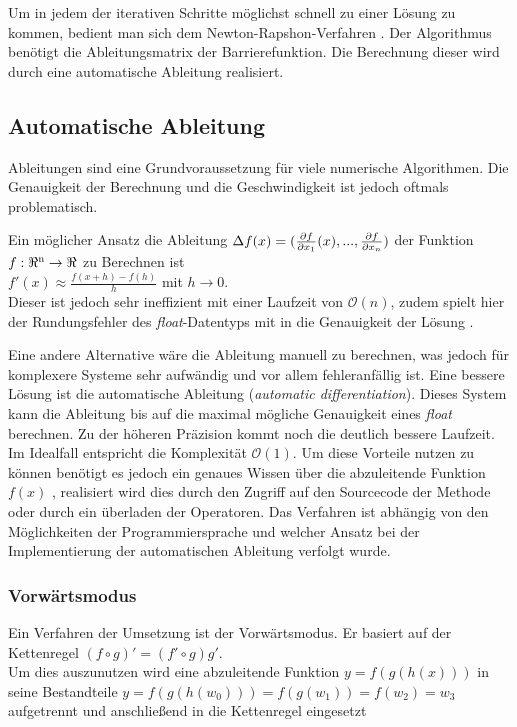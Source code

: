 \documentclass{like}
\begin{document}
Um in jedem der iterativen Schritte möglichst schnell zu einer Lösung zu kommen, bedient man sich dem Newton-Rapshon-Verfahren . 
Der Algorithmus benötigt die Ableitungsmatrix der Barrierefunktion. Die Berechnung dieser wird durch eine automatische Ableitung realisiert.

\subsection{Automatische Ableitung} 

Ableitungen sind eine Grundvoraussetzung für viele numerische Algorithmen. Die Genauigkeit der Berechnung und die Geschwindigkeit ist jedoch oftmals problematisch.

Ein möglicher Ansatz die Ableitung $\Delta{\tiny } f(x) = (\frac{\partial f}{\partial x_1} (x), ..., \frac{\partial f}{\partial x_n})$ der Funktion $f:\Re \textsuperscript{n} \rightarrow \Re $ zu Berechnen ist \\
$f'(x) \approx \frac{f(x+h) - f(h)}{h}$ mit $ h \rightarrow 0 $. \\
Dieser ist jedoch sehr ineffizient mit einer Laufzeit von $\mathcal{O}(n)$, zudem spielt hier der Rundungsfehler des \textit{float}-Datentyps mit in die Genauigkeit der Lösung \cite{julDiff}.

Eine andere Alternative wäre die Ableitung manuell zu berechnen, was jedoch für komplexere Systeme sehr aufwändig und vor allem fehleranfällig ist. Eine bessere Lösung ist die automatische Ableitung (\emph{automatic differentiation}). 
Dieses System kann die Ableitung bis auf die maximal mögliche Genauigkeit eines \textit{float} berechnen. Zu der höheren Präzision kommt noch die deutlich bessere Laufzeit. Im Idealfall entspricht die Komplexität $\mathcal{O}(1)$. Um diese Vorteile nutzen zu können benötigt es jedoch ein genaues Wissen über die abzuleitende Funktion \(f(x)\) , realisiert wird dies durch den Zugriff auf den Sourcecode der Methode oder durch ein überladen der Operatoren. Das Verfahren ist abhängig von den Möglichkeiten der Programmiersprache und welcher Ansatz bei der Implementierung der automatischen Ableitung verfolgt wurde. 
\subsubsection*{Vorwärtsmodus}
Ein Verfahren der Umsetzung ist der Vorwärtsmodus. Er basiert auf der Kettenregel $(f \circ g)' = (f' \circ g)g'$. \\
Um dies auszunutzen wird eine abzuleitende Funktion $ y = f(g(h(x)))$ in seine Bestandteile $y = f(g(h(w_0))) = f(g(w_1)) = f(w_2) = w_3$ aufgetrennt und anschließend in die Kettenregel eingesetzt 
\end{document}
